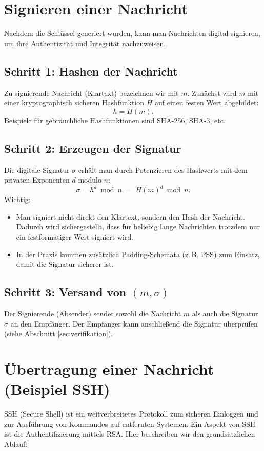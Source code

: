 \documentclass[a4paper,11pt]{article}
\begin{document}
\section{Signieren einer Nachricht}
\label{sec:signieren}
Nachdem die Schlüssel generiert wurden, kann man Nachrichten digital signieren, um ihre Authentizität und Integrität nachzuweisen.

\subsection{Schritt 1: Hashen der Nachricht}
Zu signierende Nachricht (Klartext) bezeichnen wir mit \(m\). Zunächst wird \(m\) mit einer kryptographisch sicheren Hashfunktion \(H\) auf einen festen Wert abgebildet:
\[
  h = H(m).
\]
Beispiele für gebräuchliche Hashfunktionen sind SHA-256, SHA-3, etc.

\subsection{Schritt 2: Erzeugen der Signatur}
Die digitale Signatur \(\sigma\) erhält man durch Potenzieren des Hashwerts mit dem privaten Exponenten \(d\) modulo \(n\):
\[
  \sigma = h^d \bmod n \;=\; H(m)^d \bmod n.
\]
Wichtig:
\begin{itemize}
  \item Man signiert nicht direkt den Klartext, sondern den Hash der Nachricht. Dadurch wird sichergestellt, dass für beliebig lange Nachrichten trotzdem nur ein festformatiger Wert signiert wird.
  \item In der Praxis kommen zusätzlich Padding-Schemata (z.\,B. PSS) zum Einsatz, damit die Signatur sicherer ist.
\end{itemize}

\subsection{Schritt 3: Versand von \((m, \sigma)\)}
Der Signierende (Absender) sendet sowohl die Nachricht \(m\) als auch die Signatur \(\sigma\) an den Empfänger. Der Empfänger kann anschließend die Signatur überprüfen (siehe Abschnitt \ref{sec:verifikation}).

\section{Übertragung einer Nachricht (Beispiel SSH)}
\label{sec:uebertragung}
SSH (Secure Shell) ist ein weitverbreitetes Protokoll zum sicheren Einloggen und zur Ausführung von Kommandos auf entfernten Systemen. Ein Aspekt von SSH ist die Authentifizierung mittels RSA. Hier beschreiben wir den grundsätzlichen Ablauf:
\end{document}
